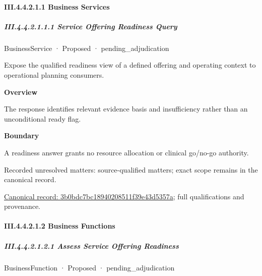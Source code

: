 \paragraph*{III.4.4.2.1.1 Business Services}
\label{navigation:III.4.4.2.1.1}

\subparagraph*{III.4.4.2.1.1.1 Service Offering Readiness Query}
\label{navigation:III.4.4.2.1.1.1}

\label{element:3b0bdc7bc18940208511f39e43d5357a}
{\small BusinessService · Proposed · pending\_adjudication}\par

Expose the qualified readiness view of a defined offering and operating context to operational planning consumers.



\textbf{Overview}



The response identifies relevant evidence basis and insufficiency rather than an unconditional ready flag.



\textbf{Boundary}



A readiness answer grants no resource allocation or clinical go/no-go authority.


{\small Recorded unresolved matters: source-qualified matters; exact scope remains in the canonical record.}\par
{\footnotesize \href{../../../../continuum/business/business-service/3b0bdc7bc18940208511f39e43d5357a.md}{Canonical record: 3b0bdc7bc18940208511f39e43d5357a}; full qualifications and provenance.}\par
\paragraph*{III.4.4.2.1.2 Business Functions}
\label{navigation:III.4.4.2.1.2}

\subparagraph*{III.4.4.2.1.2.1 Assess Service Offering Readiness}
\label{navigation:III.4.4.2.1.2.1}

\label{element:a7eb76c1ff5b450b9835ac19662c8148}
{\small BusinessFunction · Proposed · pending\_adjudication}\par

